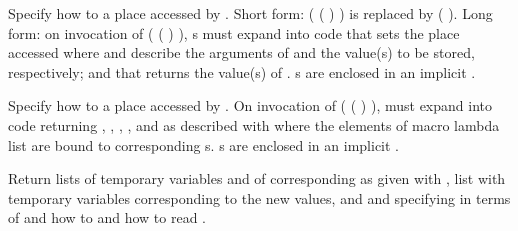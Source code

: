 \begin{LIST}{1cm}
  {
    Specify how to  a place accessed by
    .
    Short form: ( ( ) ) is
    replaced by (  ).
    Long form: on invocation of ( (
    ) ), s must expand
    into code that sets the place accessed where 
    and  describe the arguments of  and
    the value(s) to be stored, respectively; and that returns
    the value(s) of . s are enclosed in an
    implicit  .
  }

  {
  Specify how to  a place accessed by
  . On invocation of ( (
    ) ),  must expand
    into code returning , , ,
    , and  as described with
     where the elements of macro
    lambda list  are bound to corresponding
    s. s are enclosed in an implicit  .
  }

  {
    Return lists of temporary variables  and of
    corresponding  as given with ,
    list  with temporary variables
    corresponding to the new values, and 
    and  specifying in terms of 
    and  how to  and how to read
    . 
  }


\end{LIST}
